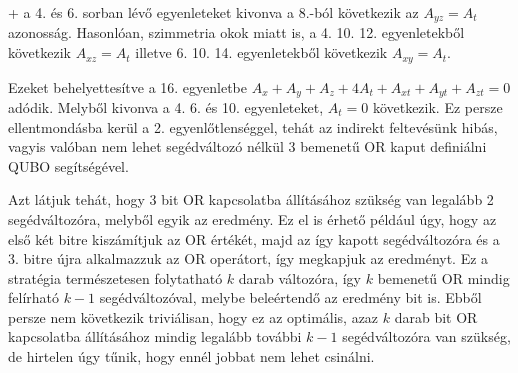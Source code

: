 \begin{theorem}
		\Az+ a 4. és 6. sorban lévő egyenleteket kivonva a 8.-ból következik az $A_{yz}=A_{t}$ azonosság. Hasonlóan, szimmetria okok miatt is, a 4. 10. 12. egyenletekből következik $A_{xz}=A_{t}$ illetve 6. 10. 14. egyenletekből következik $A_{xy}=A_{t}$.
		
		Ezeket behelyettesítve a 16. egyenletbe $A_{x}+A_{y}+A_{z}+4A_{t}+A_{xt}+A_{yt}+A_{zt}=0$ adódik. Melyből kivonva a 4. 6. és 10. egyenleteket, $A_{t}=0$ következik. Ez persze ellentmondásba kerül a 2. egyenlőtlenséggel, tehát az indirekt feltevésünk hibás, vagyis valóban nem lehet segédváltozó nélkül 3 bemenetű OR kaput definiálni QUBO segítségével.	
\end{theorem}

Azt látjuk tehát, hogy 3 bit OR kapcsolatba állításához szükség van legalább 2 segédváltozóra, melyből egyik az eredmény. Ez el is érhető például úgy, hogy az első két bitre kiszámítjuk az OR értékét, majd az így kapott segédváltozóra és a 3. bitre újra alkalmazzuk az OR operátort, így megkapjuk az eredményt. Ez a stratégia természetesen folytatható $k$ darab változóra, így $k$ bemenetű OR mindig felírható $k-1$ segédváltozóval, melybe beleértendő az eredmény bit is. Ebből persze nem következik triviálisan, hogy ez az optimális, azaz $k$ darab bit OR kapcsolatba állításához mindig legalább további $k-1$ segédváltozóra van szükség, de hirtelen úgy tűnik, hogy ennél jobbat nem lehet csinálni.

